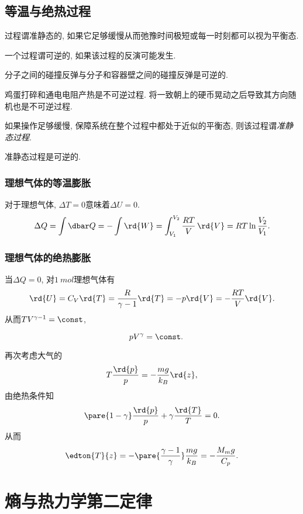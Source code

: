 \documentclass[../Thermal.tex]{subfiles}
\begin{document}
\subsection{等温与绝热过程}
\begin{definition}[准静态过程]
过程谓准静态的, 如果它足够缓慢从而弛豫时间极短或每一时刻都可以视为平衡态.
\end{definition}
\begin{definition}[可逆过程]
一个过程谓可逆的, 如果该过程的反演可能发生.
\end{definition}
\begin{ex}[可逆过程]
分子之间的碰撞反弹与分子和容器壁之间的碰撞反弹是可逆的.
\end{ex}
\begin{ex}[不可逆过程]
鸡蛋打碎和通电电阻产热是不可逆过程. 将一致朝上的硬币晃动之后导致其方向随机也是不可逆过程.
\end{ex}
如果操作足够缓慢, 保障系统在整个过程中都处于近似的平衡态, 则该过程谓\emph{准静态过程}.
\begin{finale}
\begin{axiom}
准静态过程是可逆的.
\end{axiom}
\end{finale}
\subsubsection{理想气体的等温膨胀}
对于理想气体, $\Delta T=0$意味着$\Delta U = 0$.
\[ \Delta Q = \int \dbar Q = -\int \rd{W} = \int_{V_1}^{V_2} \frac{RT}{V}\,\rd{V} = RT\ln\frac{V_2}{V_1}. \]
\subsubsection{理想气体的绝热膨胀}
当$\Delta Q = 0$, 对$\SI{1}{mol}$理想气体有
\begin{equation}
\label{eq:adiabeticidealgases}
\rd{U} = C_V \rd{T} = \frac{R}{\gamma - 1} \rd{T} = -p \rd{V} = -\frac{RT}{V}\rd{V}.
\end{equation}
从而$TV^{\gamma - 1} = \const$,
\begin{finale}
\[ \quad pV^{\gamma} = \const. \]
\end{finale}
\begin{ex}[绝热大气]
再次考虑大气的
\[ T\frac{\rd{p}}{p} = -\frac{mg}{k_B}\rd{z}, \]
由绝热条件知
\[ \pare{1-\gamma}\frac{\rd{p}}{p} + \gamma\frac{\rd{T}}{T} = 0. \]
从而
\[ \edton{T}{z} = -\pare{\frac{\gamma - 1}{\gamma}}\frac{mg}{k_B} = -\frac{M_mg}{C_p}. \]
\end{ex}
\section{熵与热力学第二定律}
\end{document}

